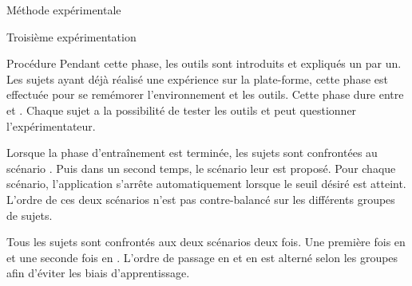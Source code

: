 \documentclass[myfrancais]{mythesis}
\begin{document}
\begin{mychapter}{Méthode expérimentale}
\begin{mysection}{Troisième expérimentation}
\begin{mysubsection}{Procédure}
				Pendant cette phase, les outils sont introduits et expliqués un par un.
				Les sujets ayant déjà réalisé une expérience sur la plate-forme, cette phase est effectuée pour se remémorer l'environnement et les outils.
				Cette phase dure entre  et .
				Chaque sujet a la possibilité de tester les outils et peut questionner l'expérimentateur.

				Lorsque la phase d'entraînement est terminée, les sujets sont confrontées au scénario .
				Puis dans un second temps, le scénario  leur est proposé.
				Pour chaque scénario, l'application s'arrête automatiquement lorsque le seuil   désiré est atteint.
				L'ordre de ces deux scénarios n'est pas contre-balancé sur les différents groupes de sujets.

				Tous les sujets sont confrontés aux deux scénarios deux fois.
				Une première fois en  et une seconde fois en .
				L'ordre de passage en  et en  est alterné selon les groupes afin d'éviter les biais d'apprentissage.


\end{mysubsection}
\end{mysection}
\end{mychapter}
\end{document}
